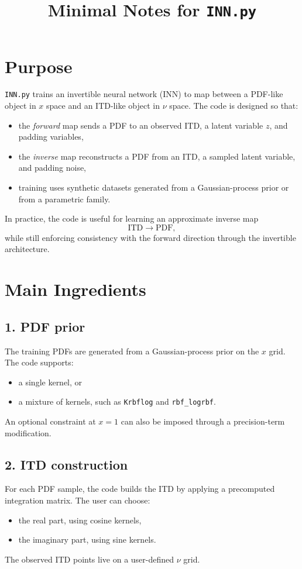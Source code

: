 \documentclass[11pt]{article}
\title{Minimal Notes for \texttt{INN.py}}
\author{}
\date{}
\begin{document}
\maketitle
\thispagestyle{empty}

\section*{Purpose}
\texttt{INN.py} trains an invertible neural network (INN) to map between a PDF-like object in $x$ space and an ITD-like object in $\nu$ space. The code is designed so that:
\begin{itemize}[leftmargin=1.5em]
    \item the \emph{forward} map sends a PDF to an observed ITD, a latent variable $z$, and padding variables,
    \item the \emph{inverse} map reconstructs a PDF from an ITD, a sampled latent variable, and padding noise,
    \item training uses synthetic datasets generated from a Gaussian-process prior or from a parametric family.
\end{itemize}

In practice, the code is useful for learning an approximate inverse map
\[
\text{ITD} \longrightarrow \text{PDF},
\]
while still enforcing consistency with the forward direction through the invertible architecture.

\section*{Main Ingredients}
\subsection*{1. PDF prior}
The training PDFs are generated from a Gaussian-process prior on the $x$ grid. The code supports:
\begin{itemize}[leftmargin=1.5em]
    \item a single kernel, or
    \item a mixture of kernels, such as \texttt{Krbflog} and \texttt{rbf\_logrbf}.
\end{itemize}
An optional constraint at $x=1$ can also be imposed through a precision-term modification.

\subsection*{2. ITD construction}
For each PDF sample, the code builds the ITD by applying a precomputed integration matrix. The user can choose:
\begin{itemize}[leftmargin=1.5em]
    \item the real part, using cosine kernels,
    \item the imaginary part, using sine kernels.
\end{itemize}
The observed ITD points live on a user-defined $\nu$ grid.
\end{document}
